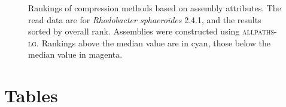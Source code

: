 \documentclass[fleqn,10pt,lineno]{wlpeerj} %
\begin{document}
\begin{figure}[h!]
\caption{Rankings of compression methods based on assembly
    attributes. The read data are for \textit{Rhodobacter
    sphaeroides} 2.4.1, and the results sorted by overall
  rank. Assemblies were constructed using \textsc{allpaths-lg}.
  Rankings above the median value are in cyan, those below the median
  value in magenta.}
  \label{fig:assembly_ranks}
\end{figure}



\section*{Tables}
\end{document}
